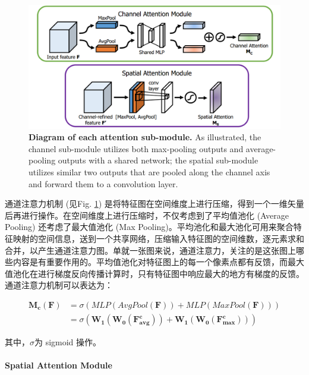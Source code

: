 \documentclass[a4paper]{ctexart}
\begin{document}
	\begin{figure}[htbp]
		\centering 
		\includegraphics[width=0.7\columnwidth]{picture/LLIE/CBAM/Attention Module}
		\caption{
			\label{fig: Attention Module} 
			\textbf{Diagram of each attention sub-module.} As illustrated, the channel sub-module utilizes both max-pooling outputs and average-pooling outputs with a shared network; the spatial sub-module utilizes similar two outputs that are pooled along the channel axis and forward them to a convolution layer.
		}
	\end{figure}
	
	通道注意力机制 (见Fig. \ref{fig: Attention Module}) 是将特征图在空间维度上进行压缩，得到一个一维矢量后再进行操作。在空间维度上进行压缩时，不仅考虑到了平均值池化 (Average Pooling) 还考虑了最大值池化 (Max Pooling)。平均池化和最大池化可用来聚合特征映射的空间信息，送到一个共享网络，压缩输入特征图的空间维数，逐元素求和合并，以产生通道注意力图。单就一张图来说，通道注意力，关注的是这张图上哪些内容是有重要作用的。平均值池化对特征图上的每一个像素点都有反馈，而最大值池化在进行梯度反向传播计算时，只有特征图中响应最大的地方有梯度的反馈。通道注意力机制可以表达为：
	
	\begin{equation}
		\begin{aligned}
			\mathbf{M_c}(\mathbf{F}) &= \sigma \left( MLP(AvgPool(\mathbf{F})) + MLP(MaxPool(\mathbf{F})) \right) \\
			&= \sigma \left( \mathbf{W_1}(\mathbf{W_0}(\mathbf{F_{avg}^c})) + \mathbf{W_1}(\mathbf{W_0}(\mathbf{F_{max}^c})) \right)	
		\end{aligned}
		\label{eq: Channel Attention Module}
	\end{equation}
	
	其中，$\sigma$为 sigmoid 操作。
	
	\paragraph{Spatial Attention Module}
	
\end{document}
